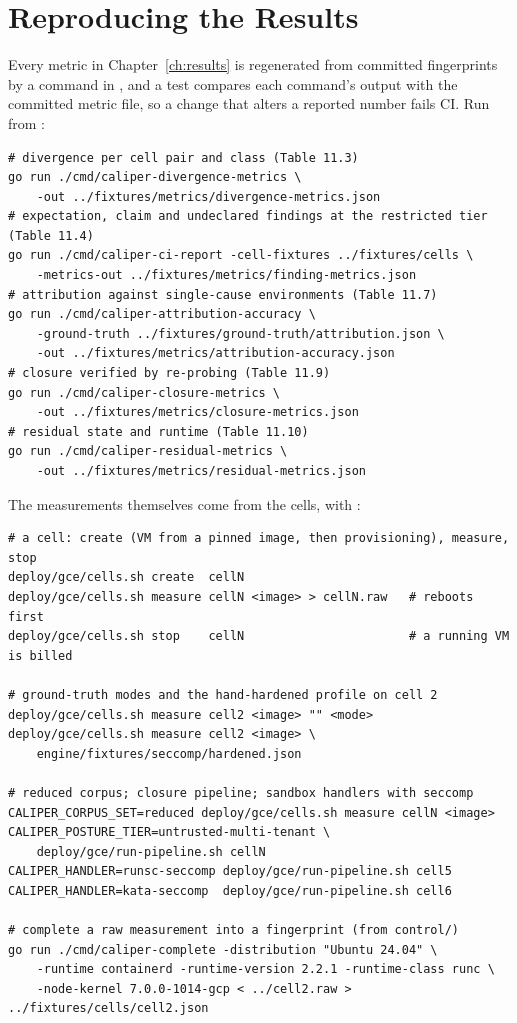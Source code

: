\chapter{Reproducing the Results}
\label{app:repro}

Every metric in Chapter~\ref{ch:results} is regenerated from committed fingerprints by a command in , and a test compares each command's output with the committed metric file, so a change that alters a reported number fails CI. Run from :

\begin{Verbatim}[fontsize=\footnotesize,frame=single,framesep=2mm]
# divergence per cell pair and class (Table 11.3)
go run ./cmd/caliper-divergence-metrics \
    -out ../fixtures/metrics/divergence-metrics.json
# expectation, claim and undeclared findings at the restricted tier (Table 11.4)
go run ./cmd/caliper-ci-report -cell-fixtures ../fixtures/cells \
    -metrics-out ../fixtures/metrics/finding-metrics.json
# attribution against single-cause environments (Table 11.7)
go run ./cmd/caliper-attribution-accuracy \
    -ground-truth ../fixtures/ground-truth/attribution.json \
    -out ../fixtures/metrics/attribution-accuracy.json
# closure verified by re-probing (Table 11.9)
go run ./cmd/caliper-closure-metrics \
    -out ../fixtures/metrics/closure-metrics.json
# residual state and runtime (Table 11.10)
go run ./cmd/caliper-residual-metrics \
    -out ../fixtures/metrics/residual-metrics.json
\end{Verbatim}

The measurements themselves come from the cells, with :

\begin{Verbatim}[fontsize=\footnotesize,frame=single,framesep=2mm]
# a cell: create (VM from a pinned image, then provisioning), measure, stop
deploy/gce/cells.sh create  cellN
deploy/gce/cells.sh measure cellN <image> > cellN.raw   # reboots first
deploy/gce/cells.sh stop    cellN                       # a running VM is billed

# ground-truth modes and the hand-hardened profile on cell 2
deploy/gce/cells.sh measure cell2 <image> "" <mode>
deploy/gce/cells.sh measure cell2 <image> \
    engine/fixtures/seccomp/hardened.json

# reduced corpus; closure pipeline; sandbox handlers with seccomp
CALIPER_CORPUS_SET=reduced deploy/gce/cells.sh measure cellN <image>
CALIPER_POSTURE_TIER=untrusted-multi-tenant \
    deploy/gce/run-pipeline.sh cellN
CALIPER_HANDLER=runsc-seccomp deploy/gce/run-pipeline.sh cell5
CALIPER_HANDLER=kata-seccomp  deploy/gce/run-pipeline.sh cell6

# complete a raw measurement into a fingerprint (from control/)
go run ./cmd/caliper-complete -distribution "Ubuntu 24.04" \
    -runtime containerd -runtime-version 2.2.1 -runtime-class runc \
    -node-kernel 7.0.0-1014-gcp < ../cell2.raw > ../fixtures/cells/cell2.json
\end{Verbatim}

